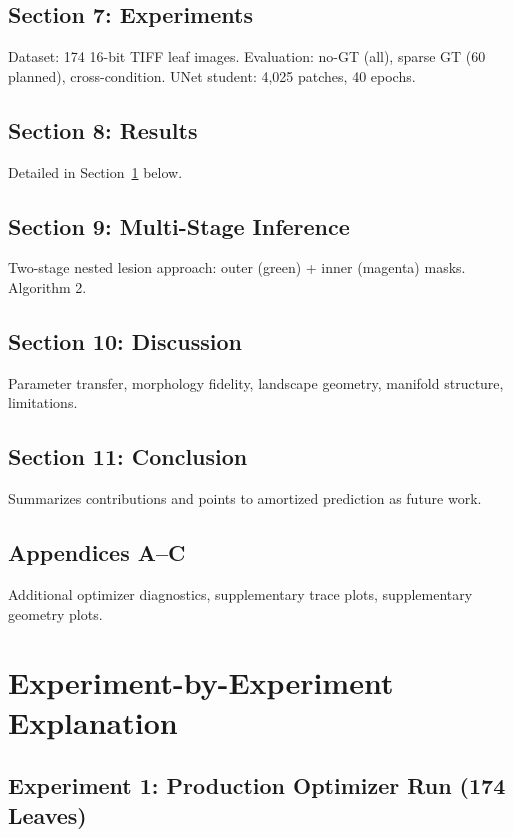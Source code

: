 \documentclass[11pt,a4paper]{article}
\begin{document}
\subsection{Section 7: Experiments}
Dataset: 174 16-bit TIFF leaf images.  Evaluation: no-GT (all), sparse GT (60 planned), cross-condition.  UNet student: 4,025 patches, 40 epochs.

\subsection{Section 8: Results}
Detailed in Section~\ref{sec:experiments} below.

\subsection{Section 9: Multi-Stage Inference}
Two-stage nested lesion approach: outer (green) + inner (magenta) masks.  Algorithm 2.

\subsection{Section 10: Discussion}
Parameter transfer, morphology fidelity, landscape geometry, manifold structure, limitations.

\subsection{Section 11: Conclusion}
Summarizes contributions and points to amortized prediction as future work.

\subsection{Appendices A--C}
Additional optimizer diagnostics, supplementary trace plots, supplementary geometry plots.

\section{Experiment-by-Experiment Explanation}
\label{sec:experiments}

\subsection{Experiment 1: Production Optimizer Run (174 Leaves)}
\end{document}
